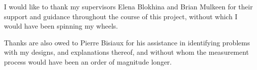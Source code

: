 I would like to thank my supervisors Elena Blokhina and Brian Mulkeen for their support and guidance throughout the course of this project, without which I would have been spinning my wheels. 

Thanks are also owed to Pierre Bisiaux for his assistance in identifying problems with my designs, and explanations thereof, and without whom the measurement process would have been an order of magnitude longer.